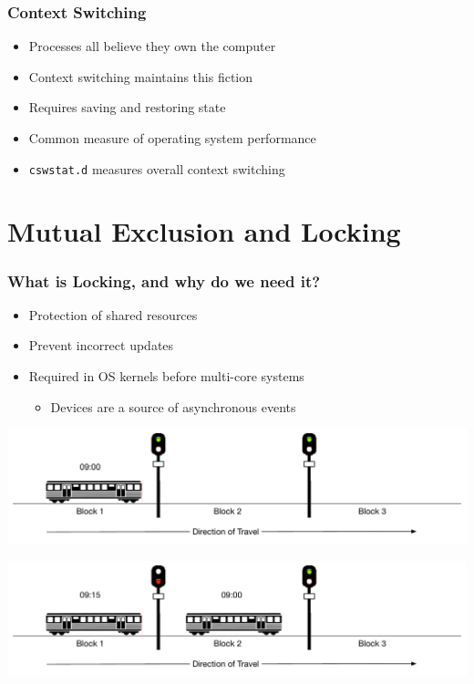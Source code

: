 \documentclass[pdftex]{beamer} %
\begin{document}
\begin{frame}[fragile]
  \frametitle{Context Switching}
  \begin{itemize}
  \item Processes all believe they own the computer
  \item Context switching maintains this fiction
  \item Requires saving and restoring state
  \item Common measure of operating system performance
  \item \verb+cswstat.d+ measures overall context switching
  \end{itemize}
\end{frame}

\section{Mutual Exclusion and Locking}
\label{sec:locking}

\begin{frame}
  \frametitle{What is Locking, and why do we need it?}
  \begin{itemize}
  \item Protection of shared resources
  \item Prevent incorrect updates
  \item Required in OS kernels before multi-core systems
    \begin{itemize}
    \item Devices are a source of asynchronous events
    \end{itemize}
  \end{itemize}
\end{frame}

\begin{frame}
      \includegraphics[width=\textwidth]{../../figures/block-signaling-1.pdf}
\end{frame}

\begin{frame}
      \includegraphics[width=\textwidth]{../../figures/block-signaling-2.pdf}
\end{frame}
\end{document}
